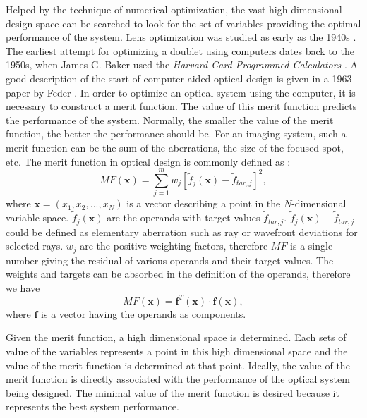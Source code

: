 Helped by the technique of numerical optimization, the vast high-dimensional design space can be searched to look for the set of variables providing the optimal performance of the system. Lens optimization was studied as early as the 1940s \cite{wikilensdesign}. The earliest attempt for optimizing a doublet using computers dates back to the 1950s, when James G. Baker used the \textit{Harvard Card Programmed Calculators} \cite{ThompsonOpticalDesignHistory}.  A good description of the start of computer-aided optical design is given in a 1963 paper by Feder \cite{Feder:63}. In order to optimize an optical system using the computer, it is necessary to construct a merit function. The value of this merit function predicts the performance of the system. Normally, the smaller the value of the merit function, the better the performance should be. For an imaging system, such a merit function can be the sum of the aberrations, the size of the focused spot, etc.  The merit function in optical design is commonly defined as \cite{GrossHBOvol3}:
\setlength{\belowdisplayshortskip}{5pt}
\setlength{\abovedisplayshortskip}{5pt}
\begin{equation} \label{eq:MFdefi}
MF(\pmb{x})=\sum_{j=1}^{m} w_j [\tilde{f}_j(\pmb{x}) - \tilde{f}_{tar,j} ]^2,
\end{equation}
\noindent where $\textbf{x} = (x_1, x_2, ..., x_N)$ is a vector describing a point in the $N$-dimensional variable space. $\tilde{f}_j(\textbf{x})$ are the operands with target values $\tilde{f}_{tar,j}$. $\tilde{f}_j(\textbf{x}) - \tilde{f}_{tar,j}$ could be defined as elementary aberration such as ray or wavefront deviations for selected rays. $w_j$ are the positive weighting factors, therefore $MF$ is a single number giving the residual of various operands and their target values. The weights and targets can be absorbed in the definition of the operands, therefore we have 
\begin{equation} \label{mf_oprand_vector}
MF(\pmb{x}) = \pmb{f}^{T}(\pmb{x})\cdot \pmb{f}(\pmb{x}),
\end{equation} where $\pmb{f}$ is a vector having the operands as components.

Given the merit function, a high dimensional space is determined. Each sets of value of the variables represents a point in this high dimensional space and the value of the merit function is determined at that point. Ideally, the value of the merit function is directly associated with the performance of the optical system being designed. The minimal value of the merit function is desired because it represents the best system performance. 

